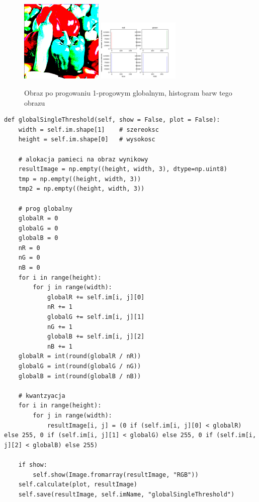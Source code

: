\documentclass[final,a4paper,openany,12pt]{mwbk}
\begin{document}
\begin{figure}[H]
	\begin{center}
		\includegraphics[width=0.35\textwidth]{peppers_color_globalSingleThreshold_result}
		\includegraphics[width=0.35\textwidth]{peppers_color_globalSingleThreshold_histogram}
	\end{center}
	\caption{Obraz po progowaniu 1-progowym globalnym, histogram barw tego obrazu}
\end{figure}


\begin{lstlisting}[caption=Progowanie 1-progowe globalne]
def globalSingleThreshold(self, show = False, plot = False):
	width = self.im.shape[1]    # szereoksc
	height = self.im.shape[0]   # wysokosc
	
	# alokacja pamieci na obraz wynikowy
	resultImage = np.empty((height, width, 3), dtype=np.uint8)
	tmp = np.empty((height, width, 3))
	tmp2 = np.empty((height, width, 3))
	
	# prog globalny
	globalR = 0
	globalG = 0
	globalB = 0
	nR = 0
	nG = 0
	nB = 0
	for i in range(height):
		for j in range(width):
			globalR += self.im[i, j][0]
			nR += 1
			globalG += self.im[i, j][1]
			nG += 1
			globalB += self.im[i, j][2]
			nB += 1
	globalR = int(round(globalR / nR))
	globalG = int(round(globalG / nG))
	globalB = int(round(globalB / nB))
	
	# kwantzyacja
	for i in range(height):
		for j in range(width):
			resultImage[i, j] = (0 if (self.im[i, j][0] < globalR) else 255, 0 if (self.im[i, j][1] < globalG) else 255, 0 if (self.im[i, j][2] < globalB) else 255)
	
	if show:
		self.show(Image.fromarray(resultImage, "RGB"))
	self.calculate(plot, resultImage)
	self.save(resultImage, self.imName, "globalSingleThreshold")
\end{lstlisting}
\end{document}
